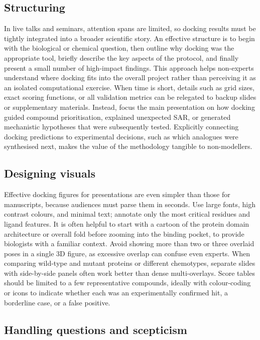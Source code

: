 \documentclass[12pt]{article}
\begin{document}
\subsection{Structuring}

In live talks and seminars, attention spans are limited, so docking results must be tightly integrated into a broader scientific story. An effective structure is to begin with the biological or chemical question, then outline why docking was the appropriate tool, briefly describe the key aspects of the protocol, and finally present a small number of high-impact findings. This approach helps non-experts understand where docking fits into the overall project rather than perceiving it as an isolated computational exercise. When time is short, details such as grid sizes, exact scoring functions, or all validation metrics can be relegated to backup slides or supplementary materials. Instead, focus the main presentation on how docking guided compound prioritisation, explained unexpected SAR, or generated mechanistic hypotheses that were subsequently tested. Explicitly connecting docking predictions to experimental decisions, such as which analogues were synthesised next, makes the value of the methodology tangible to non-modellers\cite{CH11_Berry2015,CH11_Forli2015,CH11_Pagadala2017}.

\subsection{Designing visuals}

Effective docking figures for presentations are even simpler than those for manuscripts, because audiences must parse them in seconds. Use large fonts, high contrast colours, and minimal text; annotate only the most critical residues and ligand features. It is often helpful to start with a cartoon of the protein domain architecture or overall fold before zooming into the binding pocket, to provide biologists with a familiar context. Avoid showing more than two or three overlaid poses in a single 3D figure, as excessive overlap can confuse even experts. When comparing wild-type and mutant proteins or different chemotypes, separate slides with side-by-side panels often work better than dense multi-overlays.
Score tables should be limited to a few representative compounds, ideally with colour-coding or icons to indicate whether each was an experimentally confirmed hit, a borderline case, or a false positive.

\subsection{Handling questions and scepticism}
\end{document}
